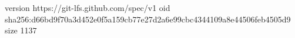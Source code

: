 version https://git-lfs.github.com/spec/v1
oid sha256:d66bd9f70a3d452e0f5a159cb77e27d2a6e99cbc4344109a8e44506feb4505d9
size 1137
